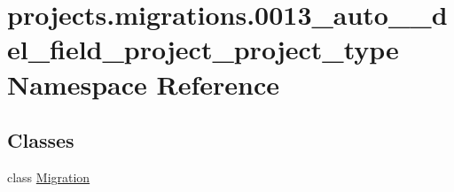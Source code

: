\hypertarget{namespaceprojects_1_1migrations_1_10013__auto____del__field__project__project__type}{\section{projects.\-migrations.0013\-\_\-auto\-\_\-\-\_\-del\-\_\-field\-\_\-project\-\_\-project\-\_\-type Namespace Reference}
\label{namespaceprojects_1_1migrations_1_10013__auto____del__field__project__project__type}
}
\subsection*{Classes}
\begin{DoxyCompactItemize}
\item 
class \hyperlink{classprojects_1_1migrations_1_10013__auto____del__field__project__project__type_1_1_migration}{Migration}
\end{DoxyCompactItemize}
